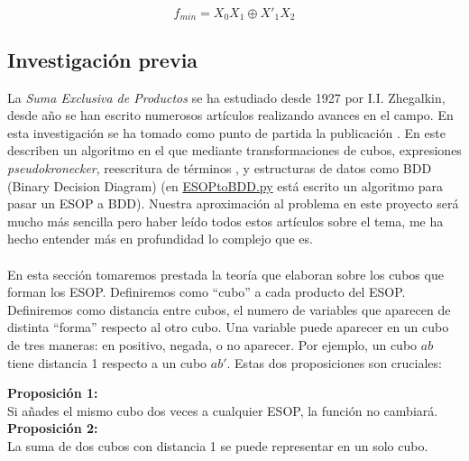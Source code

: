 \[f_{min} = X_0X_1 \oplus X'_1X_2\]
\subsection{Investigación previa}
La \textit{Suma Exclusiva de Productos} se ha estudiado desde 1927 por I.I. Zhegalkin, desde año se han escrito numerosos artículos realizando avances en el campo. En esta investigación se ha tomado como punto de partida la publicación \cite{mishchenko2001fast}. En este describen un algoritmo en el que mediante transformaciones de cubos, expresiones \textit{pseudokronecker}, reescritura de términos \cite{brand1993minimization}, y estructuras de datos como BDD (Binary Decision Diagram) (en \href{https://github.com/domingoUnican/TFGPedroCastro/blob/main/code/miscellaneous/mfsr_to_BDD.py}{ESOPtoBDD.py} está escrito un algoritmo para pasar un ESOP a BDD). Nuestra aproximación al problema en este proyecto será mucho más sencilla pero haber leído todos estos artículos sobre el tema, me ha hecho entender más en profundidad lo complejo que es.
\\\\
En esta sección tomaremos prestada la teoría que elaboran \cite{mishchenko2001fast} sobre los cubos que forman los ESOP. Definiremos como ``cubo'' a cada producto del ESOP. Definiremos como distancia entre cubos, el numero de variables que aparecen de distinta ``forma'' respecto al otro cubo. Una variable puede aparecer en un cubo de tres maneras: en positivo, negada, o no aparecer. Por ejemplo, un cubo $ab$ tiene distancia 1 respecto a un cubo $ab'$. Estas dos proposiciones son cruciales:
\begin{tcolorbox}
\textbf{Proposición 1:}\\
Si añades el mismo cubo dos veces a cualquier ESOP, la función no cambiará. \\
\textbf{Proposición 2:}\\
La suma de dos cubos con distancia 1 se puede representar en un solo cubo. 
\end{tcolorbox}





